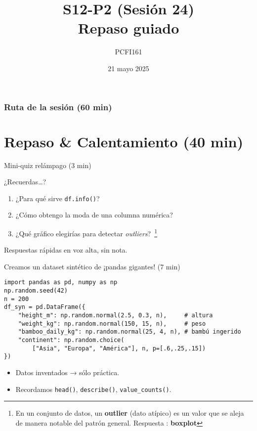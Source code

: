 \documentclass[10pt]{beamer}
\title{S12-P2 (Sesión 24)\\Repaso guiado}
\author{PCFI161}
\date{21 mayo 2025}
\begin{document}
\myfront{}

\begin{frame}
  \titlepage
\end{frame}

\begin{frame}
  \frametitle{Ruta de la sesión (60 min)}
  \tableofcontents
\end{frame}


\section{Repaso \& Calentamiento (40 min)}

\begin{frame}{Mini-quiz relámpago (3 min)}
\begin{block}{¿Recuerdas…?}
\begin{enumerate}
  \item ¿Para qué sirve \texttt{df.info()}?
  \item ¿Cómo obtengo la moda de una columna numérica?
  \item ¿Qué gráfico elegirías para detectar \textit{outliers}?~\footnote{En un conjunto de datos, un \textbf{outlier} (dato atípico) es un valor que se aleja de manera notable del patrón general. Respuesta : \textbf{boxplot}}
\end{enumerate}
\end{block}
{\scriptsize Respuestas rápidas en voz alta, sin nota.}
\end{frame}

\begin{frame}[fragile]{Creamos un dataset sintético de ¡pandas gigantes! (7 min)}
\begin{verbatim}
import pandas as pd, numpy as np
np.random.seed(42)
n = 200
df_syn = pd.DataFrame({
    "height_m": np.random.normal(2.5, 0.3, n),     # altura
    "weight_kg": np.random.normal(150, 15, n),     # peso
    "bamboo_daily_kg": np.random.normal(25, 4, n), # bambú ingerido
    "continent": np.random.choice(
        ["Asia", "Europa", "América"], n, p=[.6,.25,.15])
})
\end{verbatim}

\begin{itemize}
  \item Datos inventados → sólo práctica.
  \item Recordamos \texttt{head()}, \texttt{describe()}, \texttt{value\_counts()}.
\end{itemize}
\end{frame}
\end{document}
